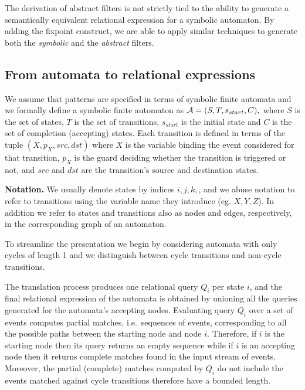 The derivation of abstract filters is not strictly tied to the ability to 
generate a semantically equivalent relational expression for a symbolic 
automaton. By adding the fixpoint construct, we are able to apply similar 
techniques to generate both the {\em symbolic} and the {\em abstract} 
filters.

\subsection{From automata to relational expressions}

We assume that patterns are specified in terms of symbolic finite automata and
we formally define a symbolic finite automaton as $\mathcal{A} = (S, T, s_{start}, C),$ 
where $S$ is the set of states, $T$ is the set of transitions, $s_{start}$ is 
the initial state and $C$ is the set of completion (accepting) states.
Each transition is defined in terms of the tuple $(X, p_X, src, dst)$ where $X$ 
is the variable binding the event considered for that transition, $p_X$ is the 
guard deciding whether the transition is triggered or not, and $src$ and $dst$ 
are the transition's source and destination states.

{\bf Notation.}
We usually denote states by indices $i, j, k,$, and we abuse notation to refer 
to transitions using the variable name they introduce (eg. $X, Y, Z$).
In addition we refer to states and transitions also as nodes and edges, 
respectively, in the corresponding graph of an automaton.

To streamline the presentation we begin by considering automata with only
cycles of length 1 and we distinguish between cycle transitions and
non-cycle transitions.


The translation process produces one relational query $Q_i$ per state $i$, and 
the final relational expression of the automata is obtained by unioning all the 
queries generated for the automata's accepting nodes.
Evaluating query $Q_i$ over a set of events computes partial matches, i.e.\ 
sequences of events, corresponding to all the possible paths between the 
starting node and node $i$.
Therefore, if $i$ is the starting node then its query returns an empty sequence 
while if $i$ is an accepting node then it returns complete matches found in the 
input stream of events.
Moreover, the partial (complete) matches computed by $Q_i$ do not include the 
events matched against cycle transitions therefore have a bounded length. 

